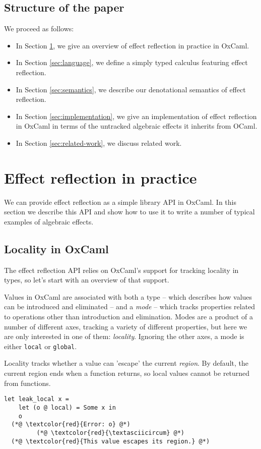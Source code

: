 \documentclass[acmsmall, screen, review, anonymous]{acmart}
\theoremstyle{definition}
\begin{document}
\subsection{Structure of the paper} We proceed as follows:
\begin{itemize}
\item In Section \ref{sec:practice}, we give an overview of effect reflection in
  practice in OxCaml.
\item In Section \ref{sec:language}, we define a simply typed calculus featuring
  effect reflection.
\item In Section \ref{sec:semantics}, we describe our denotational
  semantics of effect reflection.
\item In Section \ref{sec:implementation}, we give an implementation of effect
  reflection in OxCaml in terms of the untracked algebraic effects it
  inherits from OCaml.
\item In Section \ref{sec:related-work}, we discuss related work.
\end{itemize}

\section{Effect reflection in practice}
\label{sec:practice}

We can provide effect reflection as a simple library API in OxCaml. In
this section we describe this API and show how to use it to write a
number of typical examples of algebraic effects.

\subsection{Locality in OxCaml}

The effect reflection API relies on OxCaml's support for tracking
locality in types, so let's start with an overview of that support.

Values in OxCaml are associated with both a type -- which describes how
values can be introduced and eliminated -- and a \emph{mode} -- which
tracks properties related to operations other than introduction and
elimination. Modes are a product of a number of different axes, tracking
a variety of different properties, but here we are only interested in
one of them: \emph{locality}. Ignoring the other axes, a mode is either
\lstinline[style=oxcaml]{local} or \lstinline[style=oxcaml]{global}.

Locality tracks whether a value can 'escape' the current
\emph{region}. By default, the current region ends when a function
returns, so local values cannot be returned from functions.
\begin{lstlisting}[style=oxcaml]
  let leak_local x =
    let (o @ local) = Some x in
    o
  (*@ \textcolor{red}{Error: o} @*)
         (*@ \textcolor{red}{\textasciicircum} @*)
  (*@ \textcolor{red}{This value escapes its region.} @*)
\end{lstlisting}
\end{document}

